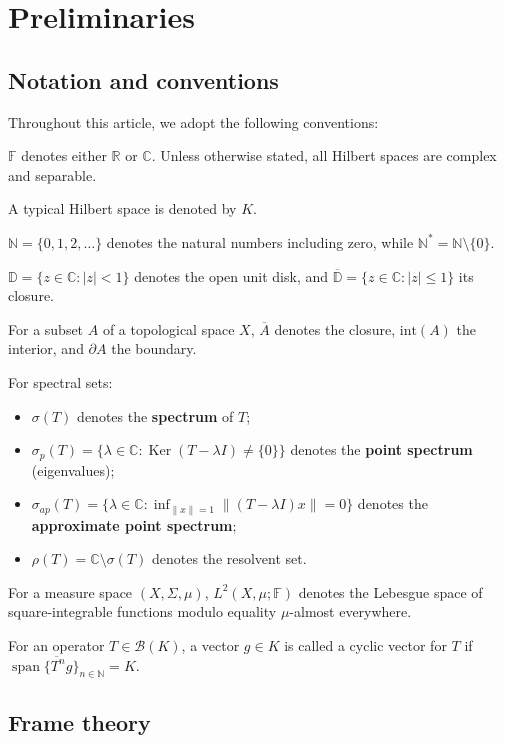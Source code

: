 \documentclass[a4paper,11pt]{article}
\theoremstyle{plain}
\theoremstyle{definition}
\theoremstyle{remark}
\DeclareMathOperator{\Span}{span}
\DeclareMathOperator{\Ker}{Ker}
\begin{document}
\section{Preliminaries}
\label{SectionPreliminaries}

\subsection{Notation and conventions}
\label{SubsectionNotation}

Throughout this article, we adopt the following conventions:

$\mathbb{F}$ denotes either $\mathbb{R}$ or $\mathbb{C}$. Unless otherwise stated, all Hilbert spaces are complex and separable. 

A typical Hilbert space is denoted by $K$.

$\mathbb{N} = \{0,1,2,\ldots\}$ denotes the natural numbers including zero, while $\mathbb{N}^* = \mathbb{N} \setminus \{0\}$.

$\mathbb{D} = \{z \in \mathbb{C} : |z| < 1\}$ denotes the open unit disk, and $\overline{\mathbb{D}} = \{z \in \mathbb{C} : |z| \leq 1\}$ its closure.

For a subset $A$ of a topological space $X$, $\overline{A}$ denotes the closure, $\text{int}(A)$ the interior, and $\partial A$ the boundary.

For spectral sets:
\begin{itemize}
\item $\sigma(T)$ denotes the \textbf{spectrum} of $T$;
\item $\sigma_p(T) = \{\lambda \in \mathbb{C} : \Ker(T - \lambda I) \neq \{0\}\}$ denotes the \textbf{point spectrum} (eigenvalues);
\item $\sigma_{ap}(T) = \{\lambda \in \mathbb{C} : \inf_{\|x\|=1} \|(T-\lambda I)x\| = 0\}$ denotes the \textbf{approximate point spectrum};
\item $\rho(T) = \mathbb{C} \setminus \sigma(T)$ denotes the resolvent set.
\end{itemize}

For a measure space $(X,\Sigma,\mu)$, $L^2(X,\mu;\mathbb{F})$ denotes the Lebesgue space of square-integrable functions modulo equality $\mu$-almost everywhere.

For an operator $T \in \mathcal{B}(K)$, a vector $g \in K$ is called a cyclic vector for $T$ if $\overline{\Span \{T^n g\}_{n \in \mathbb{N}}} = K$.

\subsection{Frame theory}
\end{document}
